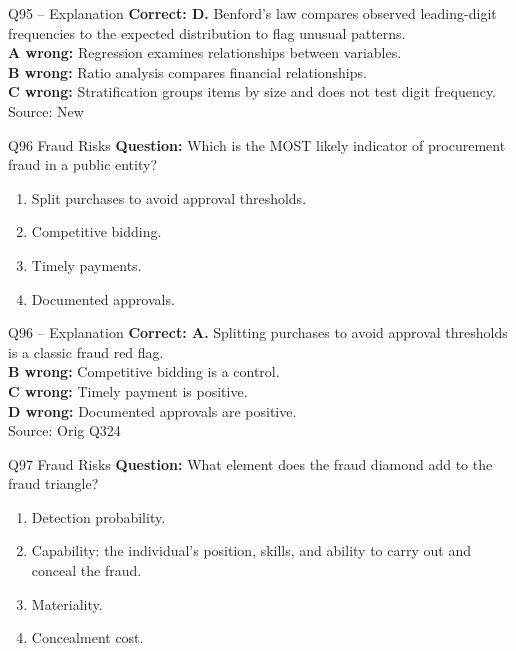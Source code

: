 \documentclass[aspectratio=169,10pt]{beamer}
\begin{document}
\begin{frame}[t]{Q95 -- Explanation}
	\footnotesize
	\textbf{Correct: D.} Benford's law compares observed leading-digit frequencies to the expected distribution to flag unusual patterns. \\[5pt]
\textbf{A wrong:} Regression examines relationships between variables. \\[3pt]
\textbf{B wrong:} Ratio analysis compares financial relationships. \\[3pt]
\textbf{C wrong:} Stratification groups items by size and does not test digit frequency. \\[3pt]
	\vfill {\tiny Source: New}
\end{frame}

\begin{frame}[t]{Q96 \hfill {\scriptsize Fraud Risks}}
	\small
	\textbf{Question:} Which is the MOST likely indicator of procurement fraud in a public entity?
	\begin{enumerate}[label=\Alph*.,itemsep=1pt,topsep=3pt]
			\item Split purchases to avoid approval thresholds.
			\item Competitive bidding.
			\item Timely payments.
			\item Documented approvals.
	\end{enumerate}
\end{frame}

\begin{frame}[t]{Q96 -- Explanation}
	\footnotesize
	\textbf{Correct: A.} Splitting purchases to avoid approval thresholds is a classic fraud red flag. \\[5pt]
\textbf{B wrong:} Competitive bidding is a control. \\[3pt]
\textbf{C wrong:} Timely payment is positive. \\[3pt]
\textbf{D wrong:} Documented approvals are positive. \\[3pt]
	\vfill {\tiny Source: Orig Q324}
\end{frame}

\begin{frame}[t]{Q97 \hfill {\scriptsize Fraud Risks}}
	\small
	\textbf{Question:} What element does the fraud diamond add to the fraud triangle?
	\begin{enumerate}[label=\Alph*.,itemsep=1pt,topsep=3pt]
			\item Detection probability.
			\item Capability: the individual's position, skills, and ability to carry out and conceal the fraud.
			\item Materiality.
			\item Concealment cost.
	\end{enumerate}
\end{frame}
\end{document}
